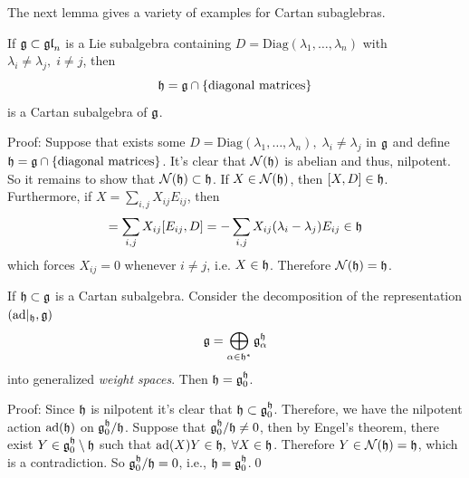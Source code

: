 The next lemma gives a variety of examples for Cartan subaglebras.
\begin{dang}
    \begin{lemma}\label{Lemma: Criteria to find Cartan subalgebras}
        If $\mathfrak{g}\subset\mathfrak{gl}_n$ is a Lie subalgebra containing $D=\text{Diag}(\lambda_1,\dots,\lambda_n)$ with 
        $\lambda_i\neq\lambda_j,\;i\neq j$, then 
        \begin{equation}
            \mathfrak{h}=\mathfrak{g}\cap\{\text{diagonal matrices}\}
        \end{equation}
        is a Cartan subalgebra of $\mathfrak{g}$.
    \end{lemma}
\end{dang}
Proof: Suppose that exists some $D=\text{Diag}(\lambda_1,\dots,\lambda_n),\;\lambda_i\neq\lambda_j$ in $\mathfrak{g}$ and 
define $\mathfrak{h}=\mathfrak{g}\cap\{\text{diagonal matrices}\}$. It's clear that $\mathcal{N}(\mathfrak{h})$ is abelian and thus, nilpotent. 
So it remains to show that $\mathcal{N}(\mathfrak{h})\subset\mathfrak{h}$. If $X\in\mathcal{N}(\mathfrak{h})$, then $[X,D]\in\mathfrak{h}$. Furthermore, if 
$X=\sum_{i,j}X_{ij}E_{ij}$, then
\begin{equation}
    [X,D]=\sum_{i,j}X_{ij}[E_{ij},D]=-\sum_{i,j}X_{ij}(\lambda_i-\lambda_j)E_{ij}\in\fr{h}
\end{equation}
which forces $X_{ij}=0$ whenever $i\neq j$, i.e. $X\in\mathfrak{h}$. Therefore $\mathcal{N}(\mathfrak{h})=\mathfrak{h}$.\par 

\begin{dang}
    \begin{lemma}
        If $\mathfrak{h}\subset\mathfrak{g}$ is a Cartan subalgebra. Consider the decomposition 
        of the representation $(\text{ad}|_{\mathfrak{h}},\mathfrak{g})$ 
        \begin{equation}
            \mathfrak{g}=\bigoplus_{\alpha\in\mathfrak{h}^*}\mathfrak{g}_\alpha^{\mathfrak{h}}
        \end{equation}
        into generalized \textit{weight spaces}. Then $\mathfrak{h}=\mathfrak{g}_0^{\mathfrak{h}}$.
    \end{lemma}
\end{dang}
Proof: Since $\mathfrak{h}$ is nilpotent it's clear that $\mathfrak{h}\subset\mathfrak{g}_0^{\mathfrak{h}}$. Therefore, we have the nilpotent action 
$\text{ad}(\mathfrak{h})$ on $\mathfrak{g}_0^{\mathfrak{h}}/\mathfrak{h}$. Suppose that $\mathfrak{g}_0^{\mathfrak{h}}/\mathfrak{h}\neq0$, then 
by Engel's theorem, there exist $Y\in\mathfrak{g}_0^{\mathfrak{h}}\setminus\mathfrak{h}$ such that 
$\text{ad}(X)Y\in\mathfrak{h},\;\forall X\in\mathfrak{h}$. Therefore $Y\in\mathcal{N}(\mathfrak{h})=\mathfrak{h}$, which is a contradiction. 
So $\mathfrak{g}_0^{\mathfrak{h}}/\mathfrak{h}=0$, i.e., $\mathfrak{h}=\mathfrak{g}_0^{\mathfrak{h}}$.\qed


